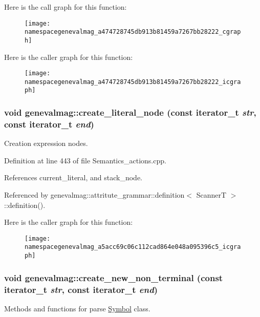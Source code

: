 Here is the call graph for this function:\nopagebreak
\begin{figure}[H]
\begin{center}
\leavevmode
\texttt{[image: namespacegenevalmag\_a474728745db913b81459a7267bb28222\_cgraph]}
\end{center}
\end{figure}




Here is the caller graph for this function:\nopagebreak
\begin{figure}[H]
\begin{center}
\leavevmode
\texttt{[image: namespacegenevalmag\_a474728745db913b81459a7267bb28222\_icgraph]}
\end{center}
\end{figure}


\hypertarget{namespacegenevalmag_a5acc69c06c112cad864e048a095396c5}{
\subsubsection[{create\_\-literal\_\-node}]{\setlength{\rightskip}{0pt plus 5cm}void genevalmag::create\_\-literal\_\-node (const iterator\_\-t {\em str}, \/  const iterator\_\-t {\em end})}}
\label{namespacegenevalmag_a5acc69c06c112cad864e048a095396c5}
Creation expression nodes. 

Definition at line 443 of file Semantics\_\-actions.cpp.



References current\_\-literal, and stack\_\-node.



Referenced by genevalmag::attritute\_\-grammar::definition$<$ ScannerT $>$::definition().



Here is the caller graph for this function:\nopagebreak
\begin{figure}[H]
\begin{center}
\leavevmode
\texttt{[image: namespacegenevalmag\_a5acc69c06c112cad864e048a095396c5\_icgraph]}
\end{center}
\end{figure}


\hypertarget{namespacegenevalmag_a6d8584e0b692b4a20384e0742b22630a}{
\subsubsection[{create\_\-new\_\-non\_\-terminal}]{\setlength{\rightskip}{0pt plus 5cm}void genevalmag::create\_\-new\_\-non\_\-terminal (const iterator\_\-t {\em str}, \/  const iterator\_\-t {\em end})}}
\label{namespacegenevalmag_a6d8584e0b692b4a20384e0742b22630a}
Methods and functions for parse \hyperlink{classgenevalmag_1_1Symbol}{Symbol} class. 


